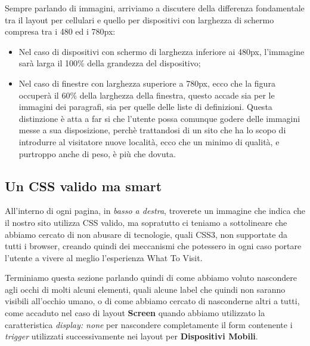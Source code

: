 Sempre parlando di immagini, arriviamo a discutere della differenza
fondamentale tra il layout per cellulari e quello per dispositivi con
larghezza di schermo compresa tra i 480 ed i 780px:
\begin{itemize}
\item Nel caso di dispositivi con schermo di larghezza inferiore ai 480px,
l'immagine sarà larga il 100\% della grandezza del dispositivo;
\item Nel caso di finestre con larghezza superiore a 780px, ecco che la figura
occuperà il 60\% della larghezza della finestra, questo accade sia per le
immagini dei paragrafi, sia per quelle delle liste di definizioni. Questa
distinzione è atta a far si che l'utente possa comunque godere delle immagini
messe a sua disposizione, perchè trattandosi di un sito che ha lo scopo di
introdurre al visitatore nuove località, ecco che un minimo di qualità, e
purtroppo anche di peso, è più che dovuta.
\end{itemize}

\subsection{Un CSS valido ma smart}\label{sec:Pres-CSSValid}
All'interno di ogni pagina, in \textit{basso a destra}, troverete un immagine
che indica che il nostro sito utilizza CSS valido, ma sopratutto ci teniamo a
sottolineare che abbiamo cercato di non abusare di tecnologie, quali CSS3, non
supportate da tutti i browser, creando quindi dei meccanismi che potessero in
ogni caso portare l'utente a vivere al meglio l'esperienza What To Visit.

Terminiamo questa sezione parlando quindi di come abbiamo voluto nascondere
agli occhi di molti alcuni elementi, quali alcune label che quindi non saranno
visibili all'occhio umano, o di come abbiamo cercato di nasconderne altri a
tutti, come accaduto nel caso di layout \textbf{Screen} quando abbiamo
utilizzato la caratteristica \textit{display: none} per nascondere
completamente il form contenente i \textit{trigger} utilizzati successivamente
nei layout per \textbf{Dispositivi Mobili}.
